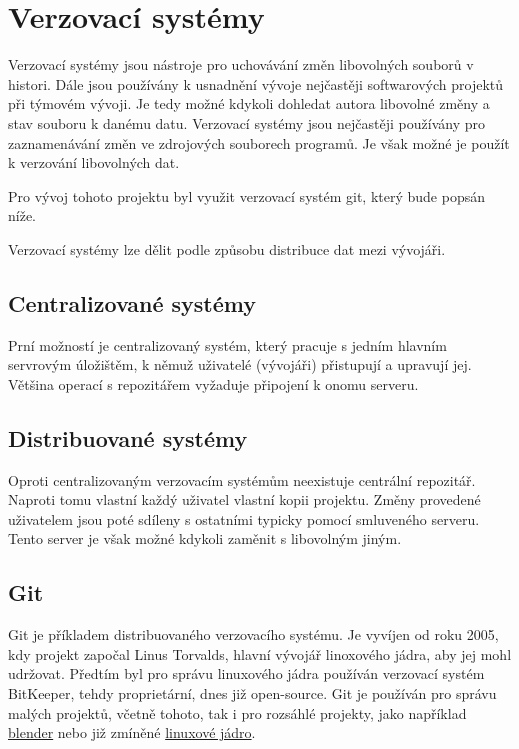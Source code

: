 \documentclass[main.tex]{subfiles}
\begin{document}
\section{Verzovací systémy}
Verzovací systémy jsou nástroje pro uchovávání změn libovolných souborů v histori. Dále jsou používány k usnadnění vývoje nejčastěji softwarových projektů při týmovém vývoji. Je tedy možné kdykoli dohledat autora libovolné změny a stav souboru k danému datu. Verzovací systémy jsou nejčastěji používány pro zaznamenávání změn ve zdrojových souborech programů. Je však možné je použít k verzování libovolných dat.

Pro vývoj tohoto projektu byl využit verzovací systém git, který bude popsán níže.

Verzovací systémy lze dělit podle způsobu distribuce dat mezi vývojáři.

\subsection{Centralizované systémy}
Prní možností je centralizovaný systém, který pracuje s jedním hlavním servrovým úložištěm, k němuž uživatelé (vývojáři) přistupují a upravují jej. Většina operací s repozitářem vyžaduje připojení k onomu serveru.

\subsection{Distribuované systémy}
Oproti centralizovaným verzovacím systémům neexistuje centrální repozitář. Naproti tomu vlastní každý uživatel vlastní kopii projektu. Změny provedené uživatelem jsou poté sdíleny s ostatními typicky pomocí smluveného serveru. Tento server je však možné kdykoli zaměnit s libovolným jiným.

\subsection{Git}
Git je příkladem distribuovaného verzovacího systému. Je vyvíjen od roku 2005, kdy projekt započal Linus Torvalds, hlavní vývojář linoxového jádra, aby jej mohl udržovat. Předtím byl pro správu linuxového jádra používán verzovací systém BitKeeper, tehdy proprietární, dnes již open-source. \cite{web:wik:git} Git je používán pro správu malých projektů, včetně tohoto, tak i pro rozsáhlé projekty, jako například \href{https://github.com/blender/blender}{blender} nebo již zmíněné \href{https://github.com/torvalds/linux}{linuxové jádro}.
\end{document}
